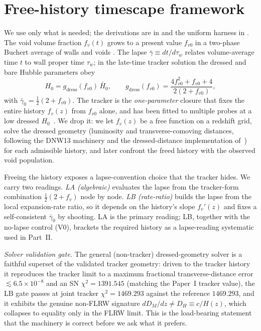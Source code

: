 \documentclass[aps,prd,twocolumn,nofootinbib,superscriptaddress,floatfix]{revtex4-2}
\newcommand{\Ho}{H_{0}}
\newcommand{\Hbaro}{\bar H_{0}}
\newcommand{\fvo}{f_{v0}}
\newcommand{\fv}{f_{v}}
\newcommand{\fvz}{f_{v}(z)}
\newcommand{\gdress}{g_{\mathrm{dress}}}
\begin{document}
\section{Free-history timescape framework}
\label{sec:framework}

We use only what is needed; the derivations are in
\cite{Wiltshire2007,Wiltshire2009,Duley2013} and the uniform harness in
\cite{Paper1}. The void volume fraction $\fv(t)$ grows to a present value $\fvo$
in a two-phase Buchert average of walls and voids
\cite{Buchert2000,WiegandBuchert2010}. The lapse
$\bar\gamma\equiv dt/d\tau_w$ relates volume-average time $t$ to wall proper time
$\tau_w$; in the late-time tracker solution the dressed and bare Hubble
parameters obey \cite[eq.~(B9)]{Wiltshire2009}
\begin{equation}
\Ho=\gdress(\fvo)\,\Hbaro,\qquad
\gdress(\fvo)=\frac{4\fvo^{2}+\fvo+4}{2(2+\fvo)},
\label{eq:dressed}
\end{equation}
with $\bar\gamma_0=\tfrac12(2+\fvo)$. The tracker is the \emph{one-parameter}
closure that fixes the entire history $\fvz$ from $\fvo$ alone, and has been
fitted to multiple probes at a low dressed $\Ho$~\cite{Leith2008,Nazer2015}. We
drop it: we
let $\fvz$ be a free function on a redshift grid, solve the dressed geometry
(luminosity and transverse-comoving distances, following the DNW13 machinery
\cite{Duley2013} and the dressed-distance implementation of~\cite{Dam2017}) for
each admissible history, and later confront the freed history with the observed
void population.

Freeing the history exposes a lapse-convention choice that the tracker hides. We
carry two readings. \emph{LA (algebraic)} evaluates the lapse from the
tracker-form combination $\tfrac12(2+\fv)$ node by node. \emph{LB (rate-ratio)}
builds the lapse from the local expansion-rate ratio, so it depends on the
history's slope $\fv'(z)$ and fixes a self-consistent $\bar\gamma_0$ by shooting.
LA is the primary reading; LB, together with the no-lapse control (V0), brackets
the required history as a lapse-reading systematic used in Part~II.

\emph{Solver validation gate.} The general (non-tracker) dressed-geometry solver
is a faithful superset of the validated tracker geometry: driven to the tracker
history it reproduces the tracker limit to a maximum fractional transverse-distance
error $\lesssim6.5\times10^{-8}$ and an SN $\chi^2=1391.545$ (matching the Paper~I
tracker value), the LB gate passes at joint tracker $\chi^2=1469.293$ against the
reference $1469.293$, and it exhibits the genuine non-FLRW signature
$dD_M/dz\neq D_H\equiv c/H(z)$, which collapses to equality only in the FLRW
limit. This is the load-bearing statement that the machinery is correct before
we ask what it prefers.
\end{document}
